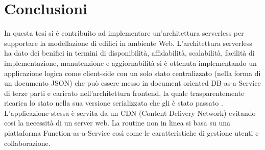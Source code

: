 \section{Conclusioni}
\label{sec:conclusions_section_1}

In questa tesi si è contribuito ad implementare un'architettura serverless per supportare la modellazione di edifici
in ambiente Web. L'architettura serverless ha dato dei benifici in termini di disponibilità, affidabilità,  scalabilità,
facilità di implementazione, manutenzione e aggiornabilità si è ottenuta implementando un applicazione logica
come client-side con un solo stato centralizzato (nella forma di un documento JSON) che può essere messo in
document oriented DB-as-a-Service di terze parti e caricato nell'architettura frontend, la quale
 trasparentemente ricarica lo stato nella sua versione serializzata che gli è stato passato .
 L'applicazione stessa è servita da un CDN (Content Delivery Network) evitando così la necessità di un server web.
 La routine non in linea si basa su una piattaforma Function-as-a-Service così come le caratteristiche
 di gestione utenti e collaborazione.

